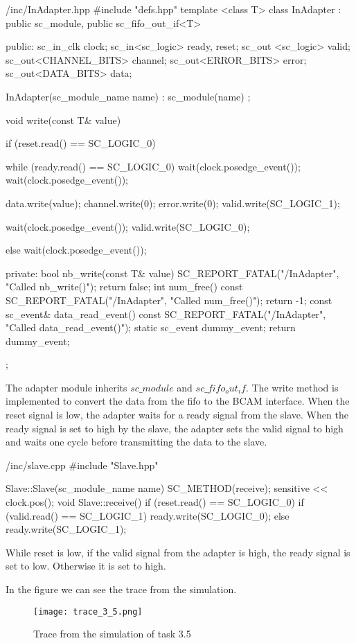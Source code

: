 \documentclass[../main.tex]{subfiles}
\begin{document}
\begin{myminted}{/inc/InAdapter.hpp}
#include "defs.hpp"
template <class T>
class InAdapter : public sc_module, public sc_fifo_out_if<T> {
public:
	sc_in_clk clock;
	sc_in<sc_logic> ready, reset;
	sc_out <sc_logic> valid;
	sc_out<CHANNEL_BITS> channel;
	sc_out<ERROR_BITS> error;
	sc_out<DATA_BITS> data;

	InAdapter(sc_module_name name) : sc_module(name) {};

	void write(const T& value) {
		if (reset.read() == SC_LOGIC_0) {

			while (ready.read() == SC_LOGIC_0) {
				wait(clock.posedge_event());
			}
			wait(clock.posedge_event());

			data.write(value);
			channel.write(0);
			error.write(0);
			valid.write(SC_LOGIC_1);

			wait(clock.posedge_event());
			valid.write(SC_LOGIC_0);
		}
		else {
			wait(clock.posedge_event());
		}
	}
private:
	bool nb_write(const T& value)
	{
		SC_REPORT_FATAL("/InAdapter", "Called nb_write()");
		return false;
	}
	int num_free() const
	{
		SC_REPORT_FATAL("/InAdapter", "Called num_free()");
		return -1;
	}
	const sc_event& data_read_event() const
	{
		SC_REPORT_FATAL("/InAdapter", "Called data_read_event()");
		static sc_event dummy_event;
		return dummy_event;
	}
};
\end{myminted}

The adapter module inherits $sc\_module$ and $sc\_fifo_out_if$. The write method is implemented to convert the data from the fifo to the BCAM interface. 
When the reset signal is low, the adapter waits for a ready signal from the slave. When the ready signal is set to high by the slave, the adapter sets the valid signal to high and waits one cycle before transmitting the data to the slave.

\begin{myminted}{/inc/slave.cpp}
#include "Slave.hpp"

Slave::Slave(sc_module_name name)
{
	SC_METHOD(receive);
	sensitive << clock.pos();
}
void Slave::receive()
{
	if (reset.read() == SC_LOGIC_0) {
		if (valid.read() == SC_LOGIC_1) {
			ready.write(SC_LOGIC_0);
		} else {
			ready.write(SC_LOGIC_1);
		}
	}
}
\end{myminted}
While reset is low, if the valid signal from the adapter is high, the ready signal is set to low. Otherwise it is set to high.

In the figure we can see the trace from the simulation. 

\begin{figure}[h]
    \centering
    \texttt{[image: trace\_3\_5.png]}
    \caption{Trace from the simulation of task 3.5}
\end{figure}
\end{document}
